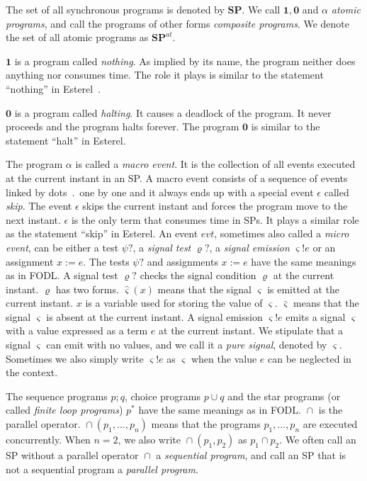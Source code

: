 \documentclass{fcs}
\newcommand{\sig}[0]{\varsigma}
\newcommand{\act}[0]{\mathit{evt}}
\newcommand{\noth}[0]{\mathbf{1}}
\newcommand{\halt}[0]{\mathbf{0}}
\newcommand{\SP}[0]{\mathbf{SP}}
\DeclareMathOperator{\seq}{;}
\DeclareMathOperator{\para}{\cap}
\newcommand{\ASP}[0]{\SP^{\mathit{at}}}
\DeclareMathOperator{\nex}{.}
\begin{document}
The set of all synchronous programs is denoted by $\SP$.
We call $\noth, \halt$ and $\alpha$ \emph{atomic programs},
and call the programs of other forms \emph{composite programs}.
We denote the set of all atomic programs as $\ASP$.

$\noth$ is a program called \emph{nothing}.
As implied by its name, the program neither does anything nor consumes time.
The role it plays is similar to the statement ``nothing'' in Esterel~\cite{Berry92}.

$\halt$ is a program called \emph{halting}. It causes a deadlock of the program.
It never proceeds and the program halts forever.
The program $\halt$ is similar to the statement ``halt'' in Esterel.

The program $\alpha$ is called a \emph{macro event}.
It is the collection of all events executed at the current instant in an SP.
A macro event consists of a sequence of events linked by dots $\nex$ one by one and it always ends up with a special event $\epsilon$ called \emph{skip}.
The event $\epsilon$ skips the current instant and forces the program move to the next instant.
$\epsilon$ is the only term that consumes time in SPs.
It plays a similar role as the statement ``skip'' in Esterel.
An event $\act$, sometimes also called a \emph{micro event}, can be either a test $\psi?$, a \emph{signal test} $\varrho?$, a \emph{signal emission} $\sig!e$ or an assignment $x := e$.
The tests $\psi?$ and assignments $x:=e$ have the same meanings as in FODL.
A signal test $\varrho?$ checks the signal condition $\varrho$ at the current instant.
$\varrho$ has two forms. $\hat{\sig}(x)$ means that the signal $\sig$ is emitted at the current instant. $x$ is a variable used for storing the value of $\sig$.
$\bar{\sig}$ means that the signal $\sig$ is absent at the current instant.
A signal emission $\sig!e$ emits a signal $\sig$ with a value expressed as a term $e$ at the current instant.
We stipulate that
a signal $\sig$ can emit with no values, and we call it a \emph{pure signal}, denoted by $\sig$.
Sometimes we also simply write $\sig!e$ as $\sig$ when the value $e$ can be neglected in the context.

The sequence programs $p\seq q$, choice programs $p\cup q$ and the star programs (or called \emph{finite loop programs}) $p^*$ have the same meanings as in FODL.
$\para$ is the parallel operator.
$\para(p_1,...,p_n)$ means that the programs $p_1,...,p_n$ are executed concurrently.
When $n=2$, we also write $\para(p_1,p_2)$ as $p_1\para p_2$.
We often call an SP without a parallel operator $\para$ a \emph{sequential program}, and call an SP that is not a sequential program a \emph{parallel program}.
\end{document}
